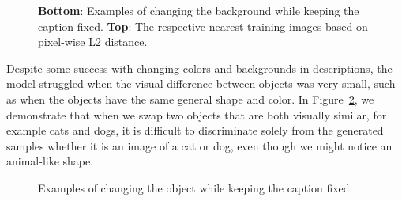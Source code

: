 \documentclass{article} %
\begin{document}
\begin{figure}[!h]
\begin{center}
%
\quad
%
\end{center}
\caption{{\bf Bottom}: Examples of changing the background while keeping the caption fixed. {\bf Top}: The respective nearest training images based on pixel-wise L2 distance.}
\label{fig:genimages2}
\vspace{-0.4cm}
\end{figure}

Despite some success with changing colors and backgrounds in descriptions, the model struggled when the visual difference between objects was very small, such as when the objects have the same general shape and color. In Figure~\ref{fig:genimages3}, we demonstrate that when we swap two objects that are both visually similar, for example cats and dogs, it is difficult to discriminate solely from the generated samples whether it is an image of a cat or dog, even though we might notice an animal-like shape.
 
\begin{figure}[!h]
\captionsetup[subfigure]{labelformat=empty}
\begin{center}
\quad
%
\quad
%
\quad
%
\quad
%
\end{center}
\caption{Examples of changing the object while keeping the caption fixed.}
\label{fig:genimages3}
\vspace{-0.3cm}
\end{figure}
\end{document}
